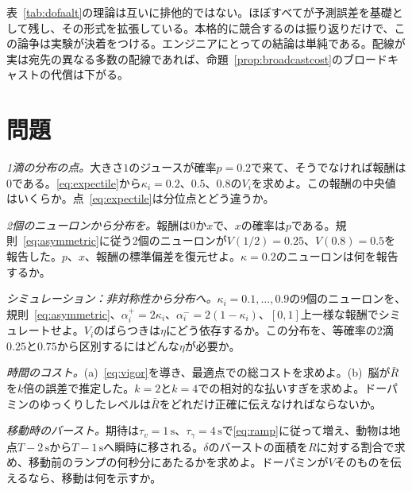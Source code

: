 表~\ref{tab:dofaalt}の理論は互いに排他的ではない。ほぼすべてが予測誤差を基礎として残し、その形式を拡張している。本格的に競合するのは振り返りだけで、この論争は実験が決着をつける。エンジニアにとっての結論は単純である。配線が実は宛先の異なる多数の配線であれば、命題~\ref{prop:broadcastcost}のブロードキャストの代償は下がる。

\section{問題}

\begin{exercise}[\lvlA]
\label{ex:07:1}
\emph{1滴の分布の点。}大きさ$1$のジュースが確率$p=0.2$で来て、そうでなければ報酬は$0$である。\eqref{eq:expectile}から$\kappa_i=0.2$、$0.5$、$0.8$の$V_i$を求めよ。この報酬の中央値はいくらか。点~\eqref{eq:expectile}は分位点とどう違うか。
\end{exercise}

\begin{exercise}[\lvlB]
\label{ex:07:2}
\emph{2個のニューロンから分布を。}報酬は$0$か$x$で、$x$の確率は$p$である。規則~\eqref{eq:asymmetric}に従う2個のニューロンが$V(1/2)=0.25$、$V(0.8)=0.5$を報告した。$p$、$x$、報酬の標準偏差を復元せよ。$\kappa=0.2$のニューロンは何を報告するか。
\end{exercise}

\begin{exercise}[\lvlB]
\label{ex:07:3}
\emph{シミュレーション：非対称性から分布へ。}$\kappa_i=0.1,\dots,0.9$の9個のニューロンを、規則~\eqref{eq:asymmetric}、$\alpha_i^+=2\kappa_i$、$\alpha_i^-=2(1-\kappa_i)$、$[0,1]$上一様な報酬でシミュレートせよ。$V_i$のばらつきは$\eta$にどう依存するか。この分布を、等確率の2滴$0.25$と$0.75$から区別するにはどんな$\eta$が必要か。
\end{exercise}

\begin{exercise}[\lvlA]
\label{ex:07:4}
\emph{時間のコスト。}(a)~\eqref{eq:vigor}を導き、最適点での総コストを求めよ。(b)~脳が$\bar R$を$k$倍の誤差で推定した。$k=2$と$k=4$での相対的な払いすぎを求めよ。ドーパミンのゆっくりしたレベルは$\bar R$をどれだけ正確に伝えなければならないか。
\end{exercise}

\begin{exercise}[\lvlB]
\label{ex:07:5}
\emph{移動時のバースト。}期待は$\tau_v=1\,\text{s}$、$\tau_\gamma=4\,\text{s}$で\eqref{eq:ramp}に従って増え、動物は地点$T-2\,\text{s}$から$T-1\,\text{s}$へ瞬時に移される。$\delta$のバーストの面積を$R$に対する割合で求め、移動前のランプの何秒分にあたるかを求めよ。ドーパミンが$V$そのものを伝えるなら、移動は何を示すか。
\end{exercise}

